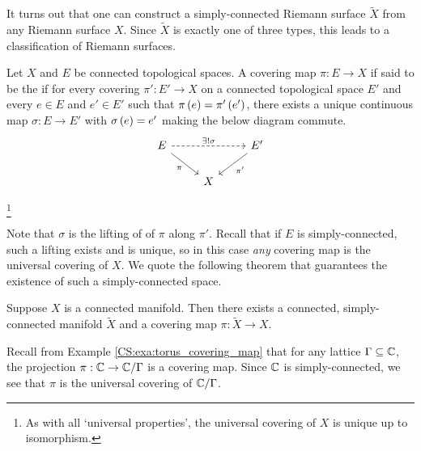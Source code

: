 \documentclass[../Moduli_Spaces_of_Riemann_Surfaces.tex]{subfiles}
\begin{document}
    \begin{remark}
        It turns out that one can construct a simply-connected Riemann surface $\tilde{X}$ from any Riemann surface $X$. Since $\tilde{X}$ is exactly one of three types, this leads to a classification of Riemann surfaces.\exqed
    \end{remark}
    \begin{definition}
        Let $X$ and $E$ be connected topological spaces. A covering map $\pi:E\to X$ if said to be the  if for every covering $\pi':E'\to X$ on a connected topological space $E'$ and every $e\in E$ and $e'\in E'$ such that $\pi\left(e\right)=\pi'\left(e'\right)$, there exists a unique continuous map $\sigma:E\to E'$ with $\sigma\left(e\right)=e'$ making the below diagram commute.
        \begin{equation*}
            \begin{tikzcd}
                E \ar[rr, "\ex!\sigma", dashed] \ar[dr, "\pi"'] & & E' \ar[dl, "\pi'"] \\
                                                    & X
            \end{tikzcd}
        \end{equation*}
    \end{definition}
    \footnote{As with all `universal properties', the universal covering of $X$ is unique up to isomorphism.}
    \vspace{-0.05in}
    \begin{remark}
        Note that $\sigma$ is the lifting of of $\pi$ along $\pi'$. Recall that if $E$ is simply-connected, such a lifting exists and is unique, so in this case \textit{any} covering map is the universal covering of $X$. We quote the following theorem that guarantees the existence of such a simply-connected space.\exqed
    \end{remark}
    \begin{theorem}
        Suppose $X$ is a connected manifold. Then there exists a connected, simply-connected manifold $\tilde{X}$ and a covering map $\pi:\tilde{X}\to X$.
    \end{theorem}
    \begin{example}
        Recall from Example \ref{CS:exa:torus_covering_map} that for any lattice $\Gamma\subseteq\mathbb{C}$, the projection $\pi:\mathbb{C}\to\mathbb{C}/\Gamma$ is a covering map. Since $\mathbb{C}$ is simply-connected, we see that $\pi$ is the universal covering of $\mathbb{C}/\Gamma$.\exqed
    \end{example}
\end{document}
